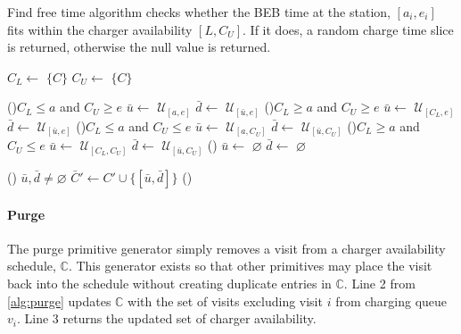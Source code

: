 \documentclass[11pt,a4paper,final]{article}
\newcommand{\C}{\mathbb{C}}                 %
\newcommand{\U}{\mathcal{U}}                %
\begin{document}
\begin{algorithm}[H]
\caption{Find free time algorithm checks whether the BEB time at the station, $[a_i, e_i]$ fits within the charger availability $[L,C_U]$. If it does, a random charge time slice is returned, otherwise the null value is returned.}
\label{alg:find-free-time}
    \LinesNumbered

    \Begin
    {  \(C_L \leftarrow\) \(\{C\}\)\; \(C_U \leftarrow\) \(\{C\}\)\;

      \If(){$C_L \leq a$ and $C_U \geq e$}
      {
        $\bar{u}\leftarrow$ $\U_{[a,e]}$\;
        $\bar{d}\leftarrow$ $\U_{[\bar{u},e]}$\;
      }
      \ElseIf(){$C_L \ge a$ and $C_U \geq e$}
      {
        $\bar{u}\leftarrow$ $\U_{[C_L,e]}$\;
        $\bar{d}\leftarrow$ $\U_{[\bar{u},e]}$\;
      }
      \ElseIf(){$C_L \leq a$ and $C_U \le e$}
      {
        $\bar{u}\leftarrow$ $\U_{[a,C_U]}$\;
        $\bar{d}\leftarrow$ $\U_{[\bar{u},C_U]}$\;
      }
      \ElseIf(){$C_L \ge a$ and $C_U \le e$}
      {
        $\bar{u}\leftarrow$ $\U_{[C_L,C_U]}$\;
        $\bar{d}\leftarrow$ $\U_{[\bar{u},C_U]}$\;
      }
      \Else()
      {
        $\bar{u}\leftarrow$ $\varnothing$\;
        $\bar{d}\leftarrow$ $\varnothing$\;
      }

      \If () {$\bar{u},\bar{d} \ne \varnothing$}
      {
        $\bar{C}' \leftarrow C' \cup \{[\bar{u},\bar{d}]\}$
      }
      \Else()
      {
      }
    }
\end{algorithm}

\paragraph{Purge}
\label{sec:purge}
The purge primitive generator simply removes a visit from a charger availability schedule, \(\C\). This generator exists
so that other primitives may place the visit back into the schedule without creating duplicate entries in \(\C\). Line 2
from \ref{alg:purge} updates \(\C\) with the set of visits excluding visit \(i\) from charging queue \(v_i\). Line 3 returns
the updated set of charger availability.
\end{document}
